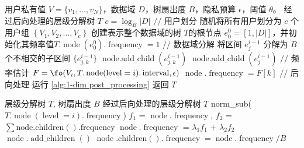 \begin{algorithm}[!htbp]
	\begin{algorithmic}[1]
        \REQUIRE 用户私有值 $V=\{v_1, \ldots, v_N\}$，数据域 $D$，树扇出度 $B$，隐私预算 $\epsilon$，阈值 $\theta$。
        \ENSURE 经过后向处理的\myahead 层级分解树 $T$
		\STATE $c = {\log_B}|D|$
		\STATE $//$ 用户划分
        \STATE 随机将所有用户划分为 $c$ 个用户组 $\left\{ V_1, V_2, \ldots, V_c \right\}$
        \STATE 创建表示整个数据域的树 $T$的根节点 $e^0_0 = [1, |D|]$，并初始化其频率值$T.\operatorname{node}(e^0_0).\operatorname{frequency} = 1$
            \STATE $//$ 数据域分解
            \STATE 将区间 $e^{i-1}_j$ 分解为 $B$ 个不相交的子区间 $\{e^{i-1}_{j,k}\}$
    		\STATE $\operatorname{node.add\_child}(e^{i-1}_{j,k})$
            \ENDFOR
            \ELSE
            \STATE $\operatorname{node.add\_child}(e^{i-1}_{j})$
            \ENDIF    		
            \ENDFOR
            \STATE $//$ 频率估计
            \STATE $F = \fo(V_i, T.\operatorname{node}(\operatorname{level}=i).\operatorname{interval}, \epsilon)$
    		\STATE $\operatorname{node}.\operatorname{frequency} = F[k]$
            \ENDFOR
        \ENDFOR
        \STATE $//$ 后向处理
        \STATE 运行 \autoref{alg:1-dim post_processing}
        \STATE 返回 $T$
	\end{algorithmic}
    \caption{构建一维\myahead 层级分解树}
    \label{Construct 1-dim prototype tree}
\end{algorithm}

\begin{algorithm}[!ht]
	\caption{后向处理}
	\label{alg:1-dim post_processing}
	\begin{algorithmic}[1]
        \REQUIRE \myahead 层级分解树 $T$, 树扇出度 $B$
        \ENSURE 经过后向处理的\myahead 层级分解树 $T$
		\STATE norm\_sub($T.\operatorname{node}(\operatorname{level}=i).\operatorname{frequency}$)
        \ENDFOR    
            \STATE $f_1$ = $\operatorname{node}.\operatorname{frequency}$, $f_2$ = $\sum{\operatorname{node.children().frequency}}$
		    \STATE $\operatorname{node}.\operatorname{frequency}$ = $\lambda_1$$f_1$ + $\lambda_2$$f_2$
            \ENDFOR 
        \ENDFOR    
		            \STATE $\operatorname{node}.\operatorname{add\_children}()$
		            \STATE $\operatorname{node}.\operatorname{children()}.\operatorname{frequency} = \operatorname{node}.\operatorname{frequency}/B$
                    \ENDIF
            \ENDFOR 
        \ENDFOR    
    \end{algorithmic}
\end{algorithm}

